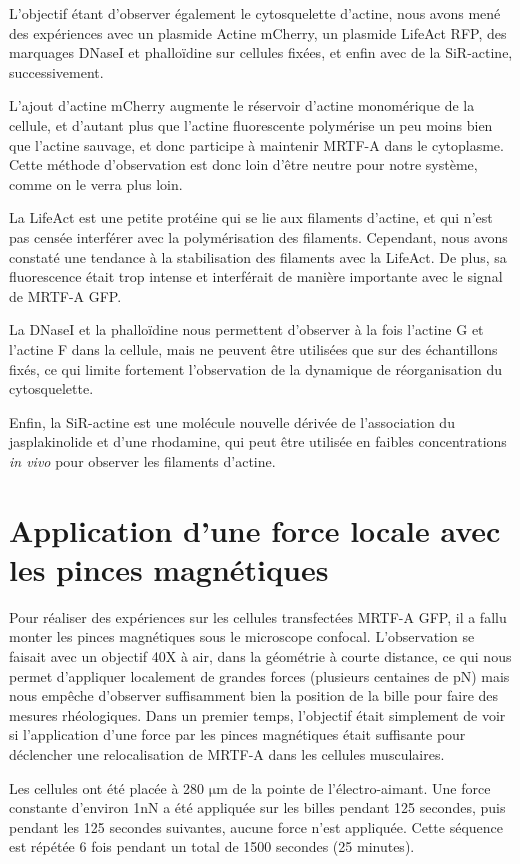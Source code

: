 \documentclass{report}
\newcommand{\micro}{$\mathrm{\mu}$}
\begin{document}
L'objectif étant d'observer également le cytosquelette d'actine, nous avons mené des expériences avec un plasmide Actine mCherry, un plasmide LifeAct RFP, des marquages DNaseI et phalloïdine sur cellules fixées, et enfin avec de la SiR-actine, successivement.
 
L'ajout d'actine mCherry augmente le réservoir d'actine monomérique de la cellule, et d'autant plus que l'actine fluorescente polymérise un peu moins bien que l'actine sauvage, et donc participe à maintenir MRTF-A dans le cytoplasme. 
Cette méthode d'observation est donc loin d'être neutre pour notre système, comme on le verra plus loin.
 
La LifeAct \cite{riedl} est une petite protéine qui se lie aux filaments d'actine, et qui n'est pas censée interférer avec la polymérisation des filaments. Cependant, nous avons constaté une tendance à la stabilisation des filaments avec la LifeAct. De plus, sa fluorescence était trop intense et interférait de manière importante avec le signal de MRTF-A GFP. 

La DNaseI et la phalloïdine nous permettent d'observer à la fois l'actine G et l'actine F dans la cellule, mais ne peuvent être utilisées que sur des échantillons fixés, ce qui limite fortement l'observation de la dynamique de réorganisation du cytosquelette.
 
Enfin, la SiR-actine est une molécule nouvelle dérivée de l'association du jasplakinolide et d'une rhodamine, qui peut être utilisée en faibles concentrations \emph{in vivo} pour observer les filaments d'actine. 


\section{Application d'une force locale avec les pinces magnétiques}

Pour réaliser des expériences sur les cellules transfectées MRTF-A GFP, il a fallu monter les pinces magnétiques sous le microscope confocal. 
L'observation se faisait avec un objectif 40X à air, dans la géométrie à courte distance, ce qui nous permet d'appliquer localement de grandes forces (plusieurs centaines de pN) mais nous empêche d'observer suffisamment bien la position de la bille pour faire des mesures rhéologiques. 
Dans un premier temps, l'objectif était simplement de voir si l'application d'une force par les pinces magnétiques était suffisante pour déclencher une relocalisation de MRTF-A dans les cellules musculaires. 

Les cellules ont été placée à 280 \micro m de la pointe de l'électro-aimant. Une force constante d'environ 1nN a été appliquée sur les billes pendant 125 secondes, puis pendant les 125 secondes suivantes, aucune force n'est appliquée. Cette séquence est répétée 6 fois pendant un total de 1500 secondes (25 minutes). 
\end{document}
